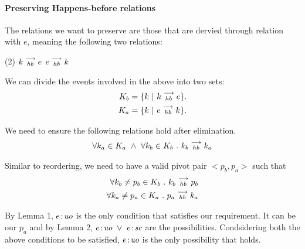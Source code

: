 \paragraph{Preserving Happens-before relations}
        
    The relations we want to preserve are those that are dervied through relation with $e$, meaning the following two relations:
    \begin{tasks}(2)
        \task $k\stackrel{\longrightarrow}{_{hb}}e$
        \task $e\stackrel{\longrightarrow}{_{hb}}k$
    \end{tasks}

    We can divide the events involved in the above into two sets:
    \begin{align*}
        K_b = \{k \ | \ k\stackrel{\longrightarrow}{_{hb}}e \}. \\
        K_a = \{k \ | \ e\stackrel{\longrightarrow}{_{hb}}k \}. 
    \end{align*}


    We need to ensure the following relations hold after elimination.
    \begin{align}
        \forall k_a \in K_a \ \wedge \ \forall k_b \in K_b \ . \ \reln{k_b}{hb}{k_a}
    \end{align}

    
    Similar to reordering, we need to have a valid pivot pair $<p_b, p_a>$ such that 
    \begin{align}
        \forall k_b \neq p_b \in K_b \ . \ k_b\stackrel{\longrightarrow}{_{hb}}p_b \\
        \forall k_a \neq p_a \in K_a \ . \ p_a\stackrel{\longrightarrow}{_{hb}}k_a 
    \end{align}

    By Lemma 1, $e\!:\!\textit{uo}$ is the only condition that satisfies our requirement. It can be our $p_a$ and by Lemma 2,  $\et{e}{uo} \   \vee \ \et{e}{sc}$ are the possibilities. Condsidering both the above conditions to be satisfied, $e\!:\!\textit{uo}$ is the only    possibility that holds. 

